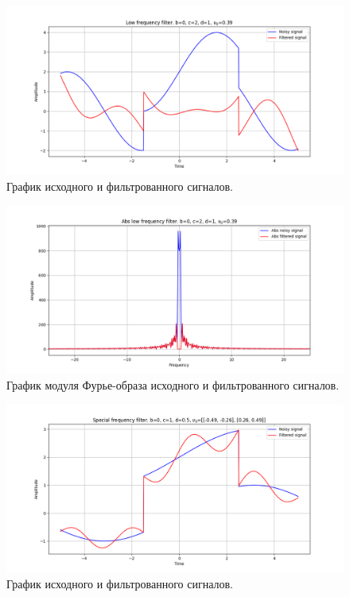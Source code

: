 \documentclass[a4paper, 12pt]{article}
\begin{document}
    \begin{figure}[!htb]
        \centering
        \includegraphics[scale=0.485]{2_2_u_flt_u_nospec.png}
        \captionsetup{skip=0pt}
        \caption{График исходного и фильтрованного сигналов.}
        \label{fig:fig81}
    \end{figure}
    \begin{figure}[!htb]
        \centering
        \includegraphics[scale=0.485]{2_2_abs_u_U_nospec.png}
        \captionsetup{skip=0pt}
        \caption{График модуля Фурье-образа исходного и фильтрованного сигналов.}
        \label{fig:fig82}
    \end{figure}
    \begin{figure}[!htb]
        \centering
        \includegraphics[scale=0.485]{3_u_flt_u_nospec.png}
        \captionsetup{skip=0pt}
        \caption{График исходного и фильтрованного сигналов.}
        \label{fig:fig83}
    \end{figure}
\end{document}
